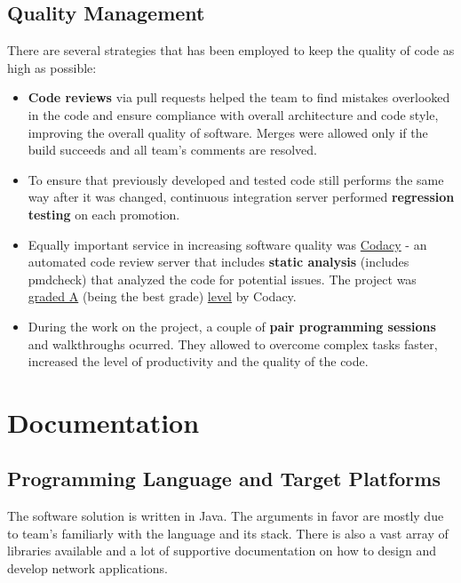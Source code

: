 \documentclass{article}
\begin{document}
\subsection{Quality Management}
There are several strategies that has been employed to keep the quality of code as high as possible:

\begin{itemize}

\item \textbf{Code reviews} via pull requests helped the team to find mistakes overlooked in the code and ensure compliance with overall architecture and code style, improving the overall quality of software. Merges were allowed only if the build succeeds and all team's comments are resolved.

\item To ensure that previously developed and tested code still performs the same way after it was changed, continuous integration server performed \textbf{regression testing} on each promotion.

\item Equally important service in increasing software quality was \href{https://www.codacy.com/app/wingsofovnia/p2p-group27-onion}{Codacy} - an automated code review server that includes \textbf{static analysis} (includes pmdcheck) that analyzed the code for potential issues. The project was \href{https://www.codacy.com/app/wingsofovnia/p2p-group27-onion}{graded A} (being the best grade) \href{https://support.codacy.com/hc/en-us/articles/207994765-What-are-the-different-Grades-and-how-are-they-calculated-}{level} by Codacy.

\item During the work on the project, a couple of \textbf{pair programming sessions} and walkthroughs ocurred. They allowed to overcome complex tasks faster, increased the level of productivity and the quality of the code.
\end{itemize}

\section{Documentation}

\subsection{Programming Language and Target Platforms}
The software solution is written in Java. The arguments in favor are mostly due to team's familiarly with the language and its stack. There is also a vast array of libraries available and a lot of supportive documentation on how to design and develop network applications.
\end{document}
